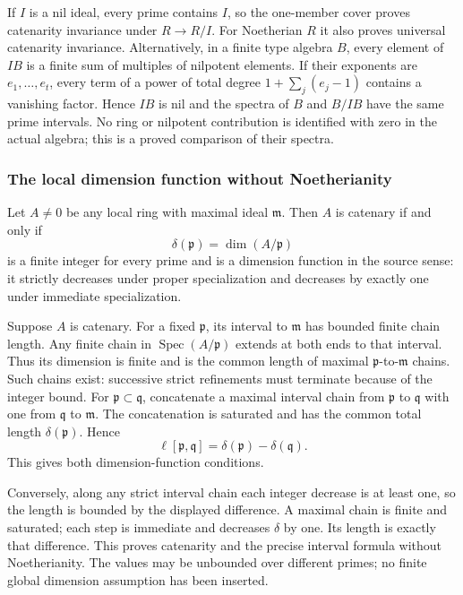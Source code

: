 If \(I\) is a nil ideal, every prime contains \(I\), so the one-member cover proves catenarity invariance under \(R\to R/I\). For Noetherian \(R\) it also proves universal catenarity invariance. Alternatively, in a finite type algebra \(B\), every element of \(IB\) is a finite sum of multiples of nilpotent elements. If their exponents are \(e_1,\ldots,e_t\), every term of a power of total degree \(1+\sum_j(e_j-1)\) contains a vanishing factor. Hence \(IB\) is nil and the spectra of \(B\) and \(B/IB\) have the same prime intervals. No ring or nilpotent contribution is identified with zero in the actual algebra; this is a proved comparison of their spectra.

\subsubsection{The local dimension function without Noetherianity}\label{the-local-dimension-function-without-noetherianity}

Let \(A\ne0\) be any local ring with maximal ideal \(\mathfrak m\). Then \(A\) is catenary if and only if \[
 \delta(\mathfrak p)=\dim(A/\mathfrak p)
\] is a finite integer for every prime and is a dimension function in the source sense: it strictly decreases under proper specialization and decreases by exactly one under immediate specialization.

Suppose \(A\) is catenary. For a fixed \(\mathfrak p\), its interval to \(\mathfrak m\) has bounded finite chain length. Any finite chain in \(\operatorname{Spec}(A/\mathfrak p)\) extends at both ends to that interval. Thus its dimension is finite and is the common length of maximal \(\mathfrak p\)-to-\(\mathfrak m\) chains. Such chains exist: successive strict refinements must terminate because of the integer bound. For \(\mathfrak p\subset\mathfrak q\), concatenate a maximal interval chain from \(\mathfrak p\) to \(\mathfrak q\) with one from \(\mathfrak q\) to \(\mathfrak m\). The concatenation is saturated and has the common total length \(\delta(\mathfrak p)\). Hence \[
 \ell[\mathfrak p,\mathfrak q]
 =\delta(\mathfrak p)-\delta(\mathfrak q).
\] This gives both dimension-function conditions.

Conversely, along any strict interval chain each integer decrease is at least one, so the length is bounded by the displayed difference. A maximal chain is finite and saturated; each step is immediate and decreases \(\delta\) by one. Its length is exactly that difference. This proves catenarity and the precise interval formula without Noetherianity. The values may be unbounded over different primes; no finite global dimension assumption has been inserted.

